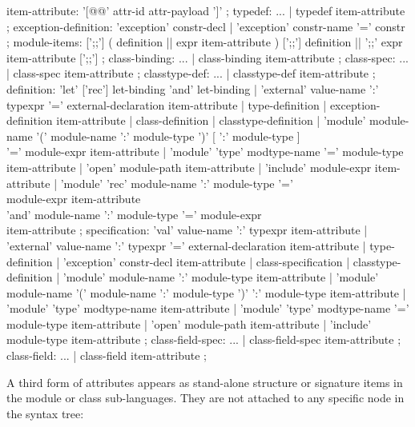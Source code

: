 \begin{syntax}
item-attribute:
    '[@@' attr-id attr-payload ']'
;
typedef: ...
   | typedef item-attribute
;
exception-definition:
        'exception' constr-decl
      | 'exception' constr-name '=' constr
;
module-items:
        [';;'] ( definition || expr { item-attribute } ) { [';;'] definition || ';;' expr { item-attribute } } [';;']
;
class-binding: ...
   | class-binding item-attribute
;
class-spec: ...
   | class-spec item-attribute
;
classtype-def: ...
   | classtype-def item-attribute
;
definition:
          'let' ['rec'] let-binding { 'and' let-binding }
        | 'external' value-name ':' typexpr '=' external-declaration { item-attribute }
        | type-definition
        | exception-definition { item-attribute }
        | class-definition
        | classtype-definition
        | 'module' module-name { '(' module-name ':' module-type ')' }
                   [ ':' module-type ] \\ '=' module-expr { item-attribute }
        | 'module' 'type' modtype-name '=' module-type { item-attribute }
        | 'open' module-path { item-attribute }
        | 'include' module-expr { item-attribute }
        | 'module' 'rec' module-name ':' module-type '=' \\
          module-expr { item-attribute } \\
          { 'and' module-name ':' module-type '=' module-expr \\
          { item-attribute } }
;
specification:
          'val' value-name ':' typexpr { item-attribute }
        | 'external' value-name ':' typexpr '=' external-declaration { item-attribute }
        | type-definition
        | 'exception' constr-decl { item-attribute }
        | class-specification
        | classtype-definition
        | 'module' module-name ':' module-type { item-attribute }
        | 'module' module-name { '(' module-name ':' module-type ')' }
          ':' module-type { item-attribute }
        | 'module' 'type' modtype-name { item-attribute }
        | 'module' 'type' modtype-name '=' module-type { item-attribute }
        | 'open' module-path { item-attribute }
        | 'include' module-type { item-attribute }
;
class-field-spec: ...
        | class-field-spec item-attribute
;
class-field: ...
        | class-field item-attribute
;
\end{syntax}

A third form of attributes appears as stand-alone structure or
signature items in the module or class sub-languages.  They are not
attached to any specific node in the syntax tree:

